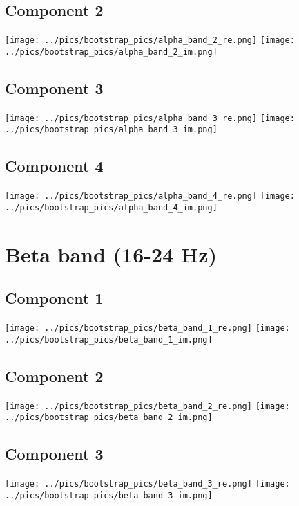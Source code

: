 \documentclass{article}
\begin{document}
\subsection*{Component 2}
\texttt{[image: ../pics/bootstrap\_pics/alpha\_band\_2\_re.png]}
\hspace{2cm}
\texttt{[image: ../pics/bootstrap\_pics/alpha\_band\_2\_im.png]}

\subsection*{Component 3}
\texttt{[image: ../pics/bootstrap\_pics/alpha\_band\_3\_re.png]}
\hspace{2cm}
\texttt{[image: ../pics/bootstrap\_pics/alpha\_band\_3\_im.png]}

\subsection*{Component 4}
\texttt{[image: ../pics/bootstrap\_pics/alpha\_band\_4\_re.png]}
\hspace{2cm}
\texttt{[image: ../pics/bootstrap\_pics/alpha\_band\_4\_im.png]}

\justify
\section{Beta band (16-24 Hz)}
\centering
\subsection*{Component 1}
\texttt{[image: ../pics/bootstrap\_pics/beta\_band\_1\_re.png]}
\hspace{2cm}
\texttt{[image: ../pics/bootstrap\_pics/beta\_band\_1\_im.png]}

\subsection*{Component 2}
\texttt{[image: ../pics/bootstrap\_pics/beta\_band\_2\_re.png]}
\hspace{2cm}
\texttt{[image: ../pics/bootstrap\_pics/beta\_band\_2\_im.png]}

\subsection*{Component 3}
\texttt{[image: ../pics/bootstrap\_pics/beta\_band\_3\_re.png]}
\hspace{2cm}
\texttt{[image: ../pics/bootstrap\_pics/beta\_band\_3\_im.png]}
\end{document}
